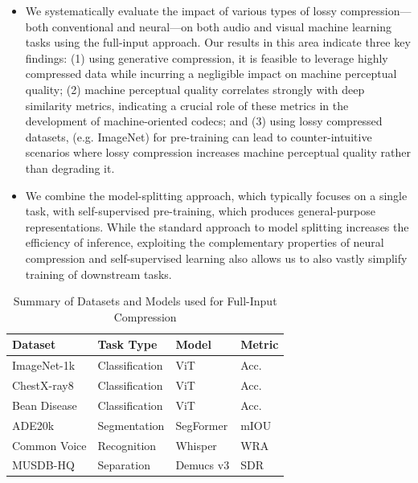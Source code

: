 \documentclass[10pt,twocolumn,letterpaper]{article}
\begin{document}
\begin{itemize}
\item We systematically evaluate the impact of various types of lossy compression---both conventional and neural---on both audio and visual machine learning tasks using the full-input approach. Our results in this area indicate three key findings: (1) using generative compression, it is feasible to leverage highly compressed data while incurring a negligible impact on machine perceptual quality; (2) machine perceptual quality correlates strongly with deep similarity metrics, indicating a crucial role of these metrics in the development of machine-oriented codecs; and (3) using lossy compressed datasets, (e.g. ImageNet) for pre-training can lead to counter-intuitive scenarios where lossy compression increases machine perceptual quality rather than degrading it.
\item We combine the model-splitting approach, which typically focuses on a single task, with self-supervised pre-training, which produces general-purpose representations. While the standard approach to model splitting increases the efficiency of inference, exploiting the complementary properties of neural compression and self-supervised learning also allows us to also vastly simplify training of downstream tasks.
\end{itemize}
\begin{table}[ht]
\centering
\caption{Summary of Datasets and Models used for Full-Input Compression}
\label{tab:datasets_models}
\begin{tabular}{llll}
\toprule
Dataset & Task Type & Model & Metric \\
\midrule
ImageNet-1k & Classification & ViT &  Acc. \\
ChestX-ray8 & Classification & ViT & Acc. \\
Bean Disease & Classification & ViT & Acc. \\
ADE20k & Segmentation & SegFormer & mIOU \\
Common Voice & Recognition & Whisper & WRA \\
MUSDB-HQ & Separation & Demucs v3 & SDR \\
\bottomrule
\end{tabular}
\end{table}
\end{document}
